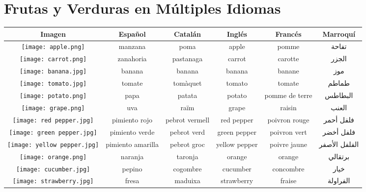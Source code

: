 \documentclass{article}
\begin{document}
\section*{Frutas y Verduras en Múltiples Idiomas}
\setlength{\LTleft}{-1cm}    %
\setlength{\LTright}{0pt plus 1fil}
\begin{longtable}{|c|c|c|c|c|c|}\hline
    \textbf{Imagen} & \textbf{Español} & \textbf{Catalán} & \textbf{Inglés} & \textbf{Francés} & \textbf{Marroquí} \\ \hline
    \texttt{[image: apple.png]} & manzana & poma & apple & pomme & تفاحة \\ \hline
    \texttt{[image: carrot.png]} & zanahoria & pastanaga & carrot & carotte & الجزر \\ \hline
    \texttt{[image: banana.jpg]} & banana & banana & banana & banane & موز \\ \hline
    \texttt{[image: tomato.jpg]} & tomate & tomàquet & tomato & tomate & طماطم \\ \hline
    \texttt{[image: potato.png]} & papa & patata & potato & pomme de terre & البطاطس \\ \hline
    \texttt{[image: grape.png]} & uva & raïm & grape & raisin & العنب \\ \hline
    \texttt{[image: red pepper.jpg]} & pimiento rojo & pebrot vermell & red pepper & poivron rouge & فلفل أحمر \\ \hline
    \texttt{[image: green pepper.jpg]} & pimiento verde & pebrot verd & green pepper & poivron vert & فلفل أخضر \\ \hline
    \texttt{[image: yellow pepper.jpg]} & pimiento amarilla & pebrot groc & yellow pepper & poivre jaune & الفلفل الأصفر \\ \hline
    \texttt{[image: orange.png]} & naranja & taronja & orange & orange & برتقالي \\ \hline
    \texttt{[image: cucumber.jpg]} & pepino & cogombre & cucumber & concombre & خيار \\ \hline
    \texttt{[image: strawberry.jpg]} & fresa & maduixa & strawberry & fraise & الفراولة \\ \hline

\end{longtable}
\end{document}
